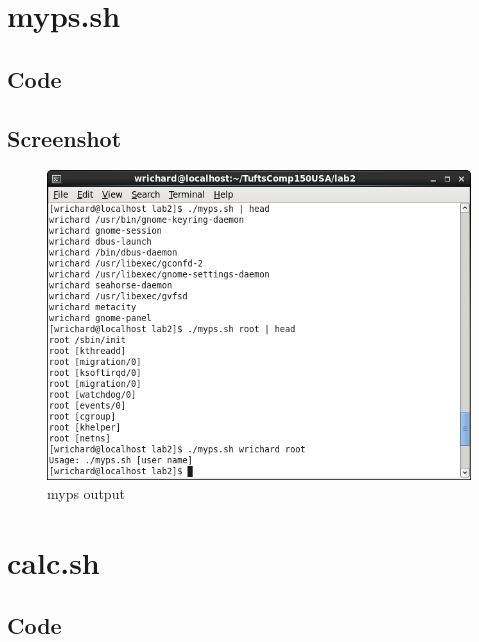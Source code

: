 \documentclass[a4paper,10pt]{article}
\title{}
\author{}
\begin{document}
\maketitle

\section{myps.sh}

\subsection{Code}


\subsection{Screenshot}
\begin{figure}[H]
 \centering
 \includegraphics[width=\linewidth]{./myps.png}
 \caption{myps output}
 \label{fig:myps}
\end{figure}

\section{calc.sh}

\subsection{Code}

\end{document}
